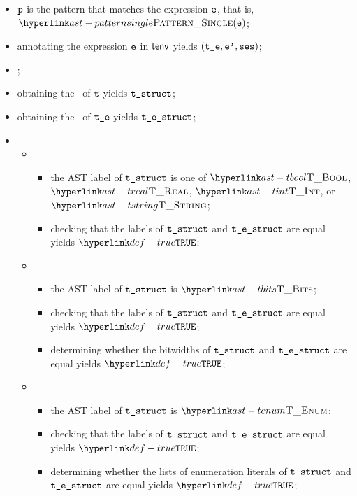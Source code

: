 \ProseParagraph
\AllApply
\begin{itemize}
  \item $\texttt{p}$ is the pattern that matches the expression $\texttt{e}$, that is, $\PatternSingle(\ve)$;
  \item annotating the expression $\texttt{e}$ in $\textsf{tenv}$ yields $(\texttt{t\_e}, \texttt{e'}, \texttt{ses})$\ProseOrTypeError;
  \item \Prosechecksymbolicallyevaluable{$\vses$};
  \item obtaining the \underlyingtype\ of $\texttt{t}$ yields $\texttt{t\_struct}$\ProseOrTypeError;
  \item obtaining the \underlyingtype\ of $\texttt{t\_e}$ yields $\texttt{t\_e\_struct}$\ProseOrTypeError;
  \item \OneApplies
  \begin{itemize}
    \item {}
    \begin{itemize}
      \item the AST label of $\texttt{t\_struct}$ is one of $\TBool$, $\TReal$, $\TInt$, or $\TString$;
      \item checking that the labels of $\texttt{t\_struct}$ and $\texttt{t\_e\_struct}$ are equal yields $\True$\ProseOrTypeError;
    \end{itemize}

    \item {}
    \begin{itemize}
      \item the AST label of $\texttt{t\_struct}$ is $\TBits$;
      \item checking that the labels of $\texttt{t\_struct}$ and $\texttt{t\_e\_struct}$ are equal yields $\True$\ProseOrTypeError;
      \item determining whether the bitwidths of $\texttt{t\_struct}$ and $\texttt{t\_e\_struct}$ are equal yields $\True$\ProseOrTypeError;
    \end{itemize}

    \item {}
    \begin{itemize}
      \item the AST label of $\texttt{t\_struct}$ is $\TEnum$;
      \item checking that the labels of $\texttt{t\_struct}$ and $\texttt{t\_e\_struct}$ are equal yields $\True$\ProseOrTypeError;
      \item determining whether the lists of enumeration literals of $\texttt{t\_struct}$ and $\texttt{t\_e\_struct}$ are equal yields $\True$\ProseOrTypeError;
    \end{itemize}


\end{itemize}
\end{itemize}
